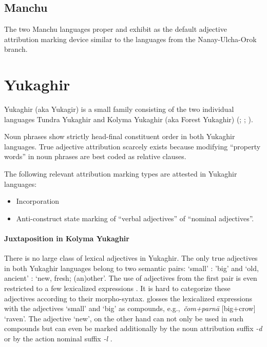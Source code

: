 \subsection{Manchu}
The two Manchu languages  proper and  exhibit  as the default adjective attribution marking device similar to the languages from the Nanay-Ulcha-Orok branch.

\section{Yukaghir}\label{yukagir synchr}
Yukaghir (aka Yukagir) is a small family consisting of the two individual languages Tundra Yukaghir and Kolyma Yukaghir (aka Forest Yukaghir) (\citealt[223]{salminen2007}; \citealt[1–2]{maslova2003a}; \citealt[1]{maslova2003b}).

Noun phrases show strictly head-final constituent order in both Yukaghir languages. True adjective attribution scarcely exists because modifying “property words” in noun phrases are best coded as relative clauses.

The following relevant attribution marking types are attested in Yukaghir languages:
\begin{itemize}
\item Incorporation
\item Anti\hyp{}construct state marking
	\subitem of “verbal adjectives”
	\subitem of “nominal adjectives”.
\end{itemize}

\paragraph*{Juxtaposition in Kolyma Yukaghir}
There is no large class of lexical adjectives in Yukaghir. The only true adjectives in both Yukaghir languages belong to two semantic pairs: ‘small’ : ’big’ and ‘old, ancient’ : ‘new, fresh; (an)other’. The use of adjectives from the first pair is even restricted to a few lexicalized expressions \cite[70–71]{maslova2003b}. It is hard to categorize these adjectives according to their morpho-syntax. \citet[71]{maslova2003b} glosses the lexicalized expressions with the adjectives ‘small’ and ‘big’ as compounds, e.g.,~\textit{čom+parnā} [big+crow] ‘raven’. The adjective ‘new’, on the other hand can not only be used in such compounds but can even be marked additionally by the noun attribution suffix \textit{-d} or by the action nominal suffix \textit{-l} \cite[71]{maslova2003b}.

